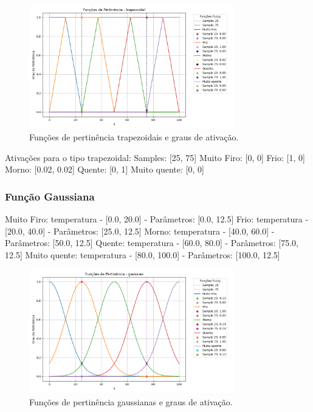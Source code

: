 \documentclass[a4paper,12pt]{article}
\begin{document}
\begin{figure}[H]
    \centering
    \includegraphics[width=0.8\textwidth]{img/funções_de_pertinência_trapezoidal_fuzzificado.png}
    \caption{Funções de pertinência trapezoidais e graus de ativação.}
\end{figure}

Ativações para o tipo trapezoidal:
Samples: [25, 75]
Muito Firo: [0, 0]
Frio: [1, 0]
Morno: [0.02, 0.02]
Quente: [0, 1]
Muito quente: [0, 0]

\subsubsection{Função Gaussiana}
Muito Firo: temperatura - [0.0, 20.0] - Parâmetros: [0.0, 12.5]
Frio: temperatura - [20.0, 40.0] - Parâmetros: [25.0, 12.5]
Morno: temperatura - [40.0, 60.0] - Parâmetros: [50.0, 12.5]
Quente: temperatura - [60.0, 80.0] - Parâmetros: [75.0, 12.5]
Muito quente: temperatura - [80.0, 100.0] - Parâmetros: [100.0, 12.5]

\begin{figure}[H]
    \centering
    \includegraphics[width=0.8\textwidth]{img/funções_de_pertinência_gaussian_fuzzificado.png}
    \caption{Funções de pertinência gaussianas e graus de ativação.}
\end{figure}
\end{document}
